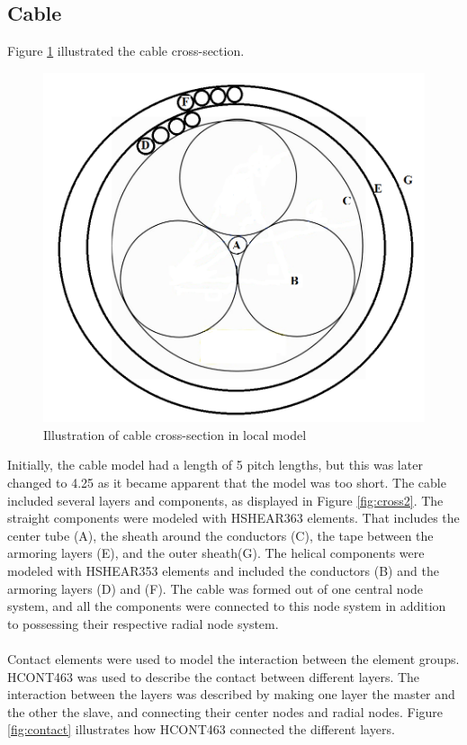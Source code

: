 \subsection{Cable}
 Figure \ref{fig:crosspro} illustrated the cable cross-section.
\begin{figure}[H]
\centering
\includegraphics[scale=0.8]{figures/cross2}
\caption [$\; \:$ Cable cross-section in the local model]{Illustration of cable cross-section in local model}
 \label{fig:crosspro}
\end{figure}
Initially, the cable model had a length of 5 pitch lengths, but this was later changed to 4.25 as it became apparent that the model was too short. The cable included several layers and components, as displayed in Figure \ref{fig:cross2}.  The straight components were modeled with HSHEAR363 elements. That includes the center tube (A), the sheath around the conductors (C), the tape between the armoring layers (E), and the outer sheath(G). The helical components were modeled with HSHEAR353 elements and included the conductors (B) and the armoring layers (D) and (F). The cable was formed out of one central node system, and all the components were connected to this node system in addition to possessing their respective radial node system.\\\\ Contact elements were used to model the interaction between the element groups. HCONT463 was used to describe the contact between different layers. The interaction between the layers was described by making one layer the master and the other the slave, and connecting their center nodes and radial nodes.  Figure \ref{fig:contact} illustrates how HCONT463 connected the different layers.


